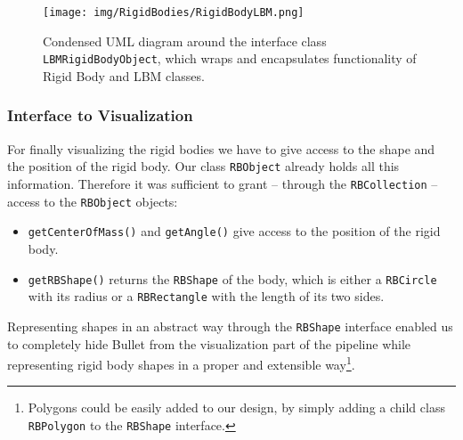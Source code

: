 \begin{figure}
	\texttt{[image: img/RigidBodies/RigidBodyLBM.png]}
	\caption{Condensed UML diagram around the interface class \texttt{LBMRigidBodyObject}, which wraps and encapsulates functionality of Rigid Body and LBM classes.}
	\label{fig:LBMRigUML}
\end{figure}
%

\subsubsection{Interface to Visualization}

For finally visualizing the rigid bodies we have to give access to the shape and the position of the rigid body. Our class \texttt{RBObject} already holds all this information. Therefore it was sufficient to grant -- through the \texttt{RBCollection} -- access to the \texttt{RBObject} objects:
\begin{itemize}
\item \texttt{getCenterOfMass()} and \texttt{getAngle()} give access to the position of the rigid body.
\item \texttt{getRBShape()} returns the \texttt{RBShape} of the body, which is either a \texttt{RBCircle} with its radius or a \texttt{RBRectangle} with the length of its two sides.
\end{itemize}
Representing shapes in an abstract way through the \texttt{RBShape} interface enabled us to completely hide Bullet from the visualization part of the pipeline while representing rigid body shapes in a proper and extensible way\footnote{Polygons could be easily added to our design, by simply adding a child class \texttt{RBPolygon} to the \texttt{RBShape} interface.}. 

